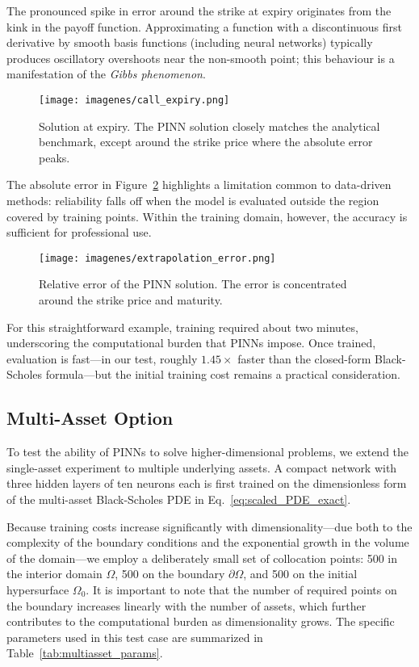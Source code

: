 \documentclass[12pt]{report} %
\theoremstyle{plain}           %
\theoremstyle{definition}      %
\theoremstyle{remark}          %
\begin{document}
The pronounced spike in error around the strike at expiry originates from the kink in the payoff function.
Approximating a function with a discontinuous first derivative by smooth basis functions (including neural networks) 
typically produces oscillatory overshoots near the non-smooth point; this behaviour is a manifestation of 
the \emph{Gibbs phenomenon}.

\begin{figure}[H]
    \centering
    \texttt{[image: imagenes/call\_expiry.png]}
    \caption{Solution at expiry. The PINN solution closely matches the analytical benchmark, except around the strike price where the absolute error peaks.}
    \label{fig:call_option_expiry}
\end{figure}

The absolute error in Figure~\ref{fig:call_option_error_rel} highlights a limitation common to 
data-driven methods: reliability falls off when the model is evaluated outside the region covered by 
training points. Within the training domain, however, the accuracy is sufficient for professional use.

\begin{figure}[H]
    \centering
    \texttt{[image: imagenes/extrapolation\_error.png]}
    \caption{Relative error of the PINN solution. The error is concentrated around the strike price and maturity.}
    \label{fig:call_option_error_rel}
\end{figure}

For this straightforward example, training required about two minutes, underscoring the computational 
burden that PINNs impose. Once trained, evaluation is fast—in our test, roughly \(1.45\times\) faster than 
the closed-form Black-Scholes formula—but the initial training cost remains a practical consideration.

\subsection{Multi-Asset Option}

To test the ability of PINNs to solve higher-dimensional problems, we extend the single-asset 
experiment to multiple underlying assets. A compact network with three hidden layers of ten 
neurons each is first trained on the dimensionless form of the multi-asset Black-Scholes PDE 
in Eq.~\eqref{eq:scaled_PDE_exact}. 

Because training costs increase significantly with 
dimensionality—due both to the complexity of the boundary conditions and the exponential 
growth in the volume of the domain—we employ a deliberately small set of collocation points: 
500 in the interior domain \(\Omega\), 500 on the boundary \(\partial\Omega\), and 500 on the 
initial hypersurface \(\Omega_0\). It is important to note that the number of required points 
on the boundary increases linearly with the number of assets, which further contributes to 
the computational burden as dimensionality grows. The specific parameters used in this test 
case are summarized in Table~\ref{tab:multiasset_params}.
\end{document}
